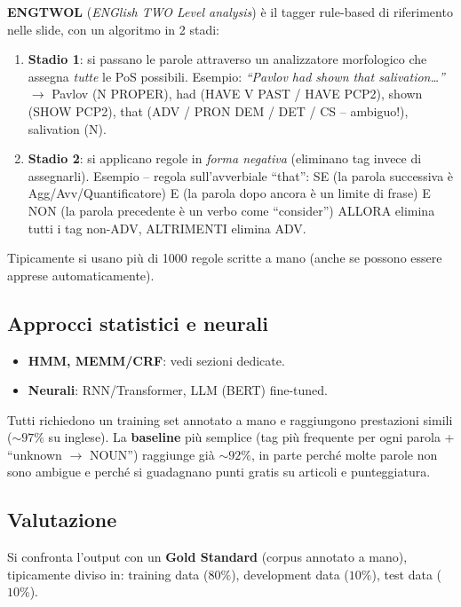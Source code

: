 \documentclass[12pt,a4paper]{article}
\begin{document}
\textbf{ENGTWOL} (\emph{ENGlish TWO Level analysis}) è il tagger rule-based di riferimento nelle slide, con un algoritmo in 2 stadi:
\begin{enumerate}[leftmargin=1.5em, label=\arabic*.]
  \item \textbf{Stadio 1}: si passano le parole attraverso un analizzatore morfologico che assegna \emph{tutte} le PoS possibili. Esempio: \textit{``Pavlov had shown that salivation\ldots''} $\to$ Pavlov (N PROPER), had (HAVE V PAST / HAVE PCP2), shown (SHOW PCP2), that (ADV / PRON DEM / DET / CS -- ambiguo!), salivation (N).
  \item \textbf{Stadio 2}: si applicano regole in \emph{forma negativa} (eliminano tag invece di assegnarli). Esempio -- regola sull'avverbiale ``that'': SE (la parola successiva è Agg/Avv/Quantificatore) E (la parola dopo ancora è un limite di frase) E NON (la parola precedente è un verbo come ``consider'') ALLORA elimina tutti i tag non-ADV, ALTRIMENTI elimina ADV.
\end{enumerate}
Tipicamente si usano più di 1000 regole scritte a mano (anche se possono essere apprese automaticamente).

\subsection{Approcci statistici e neurali}

\begin{itemize}[leftmargin=1.5em]
  \item \textbf{HMM, MEMM/CRF}: vedi sezioni dedicate.
  \item \textbf{Neurali}: RNN/Transformer, LLM (BERT) fine-tuned.
\end{itemize}
Tutti richiedono un training set annotato a mano e raggiungono prestazioni simili ($\sim 97\%$ su inglese). La \textbf{baseline} più semplice (tag più frequente per ogni parola + ``unknown $\to$ NOUN'') raggiunge già $\sim 92\%$, in parte perché molte parole non sono ambigue e perché si guadagnano punti gratis su articoli e punteggiatura.

\subsection{Valutazione}

Si confronta l'output con un \textbf{Gold Standard} (corpus annotato a mano), tipicamente diviso in: training data ($80\%$), development data ($10\%$), test data ($10\%$).
\end{document}

